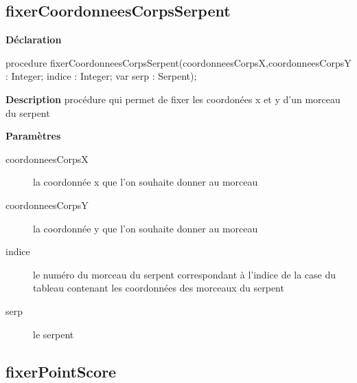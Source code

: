 \documentclass{report}
\newif\ifpdf
\begin{document}
\subsection*{fixerCoordonneesCorpsSerpent}
\fi
\label{Types-fixerCoordonneesCorpsSerpent}
\begin{list}{}{
\setlength{\itemindent}{0cm}
\setlength{\listparindent}{0cm}
\setlength{\leftmargin}{\evensidemargin}
\addtolength{\leftmargin}{\tmplength}
\settowidth{\labelsep}{X}
\addtolength{\leftmargin}{\labelsep}
\setlength{\labelwidth}{\tmplength}
}
\item[\textbf{Déclaration}\hfill]
\ifpdf
\begin{flushleft}
\fi
\begin{ttfamily}
procedure fixerCoordonneesCorpsSerpent(coordonneesCorpsX,coordonneesCorpsY : Integer; indice : Integer; var serp : Serpent);\end{ttfamily}

\ifpdf
\end{flushleft}
\fi

\par
\item[\textbf{Description}]
procédure qui permet de fixer les coordonées x et y d'un morceau du serpent    \par
\item[\textbf{Paramètres}]
\begin{description}
\item[coordonneesCorpsX] la coordonnée x que l'on souhaite donner au morceau
\item[coordonneesCorpsY] la coordonnée y que l'on souhaite donner au morceau
\item[indice] le numéro du morceau du serpent correspondant à l'indice de la case du tableau contenant les coordonnées des morceaux du serpent
\item[serp] le serpent
\end{description}


\end{list}
\ifpdf
\subsection*{\large{\textbf{fixerPointScore}}\normalsize\hspace{1ex}\hrulefill}
\else
\end{document}
